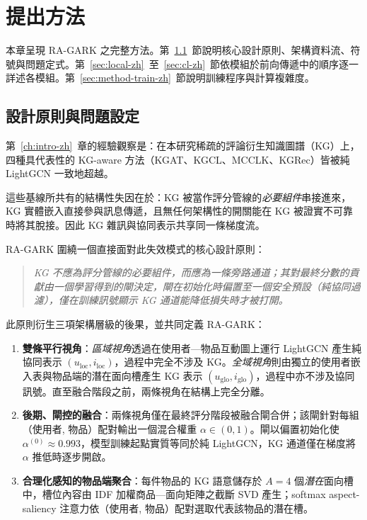 \chapter{提出方法}
\label{ch:methodology-zh}
\label{ch:architecture-zh}

本章呈現 RA-GARK 之完整方法。第~\ref{sec:approach-principle-zh}~節說明核心設計原則、架構資料流、符號與問題定式。第~\ref{sec:local-zh}~至~\ref{sec:cl-zh}~節依模組於前向傳遞中的順序逐一詳述各模組。第~\ref{sec:method-train-zh}~節說明訓練程序與計算複雜度。

\section{設計原則與問題設定}
\label{sec:approach-principle-zh}

第~\ref{ch:intro-zh}~章的經驗觀察是：在本研究稀疏的評論衍生知識圖譜（KG）上，四種具代表性的 KG-aware 方法（KGAT、KGCL、MCCLK、KGRec）皆被純 LightGCN 一致地超越。

這些基線所共有的結構性失因在於：KG 被當作評分管線的\emph{必要組件}串接進來，KG 實體嵌入直接參與訊息傳遞，且無任何架構性的開關能在 KG 被證實不可靠時將其脫接。因此 KG 雜訊與協同表示共享同一條梯度流。

RA-GARK 圍繞一個直接面對此失效模式的核心設計原則：

\begin{quote}
\emph{KG 不應為評分管線的必要組件，而應為一條旁路通道；其對最終分數的貢獻由一個學習得到的閘決定，閘在初始化時偏置至一個安全預設（純協同過濾），僅在訓練訊號顯示 KG 通道能降低損失時才被打開。}
\end{quote}

此原則衍生三項架構層級的後果，並共同定義 RA-GARK：

\begin{enumerate}
  \item \textbf{雙條平行視角}：\emph{區域視角}透過在使用者—物品互動圖上運行 LightGCN 產生純協同表示 $(u_{\mathrm{loc}}, i_{\mathrm{loc}})$，過程中完全不涉及 KG。\emph{全域視角}則由獨立的使用者嵌入表與物品端的潛在面向槽產生 KG 表示 $(u_{\mathrm{glo}}, i_{\mathrm{glo}})$，過程中亦不涉及協同訊號。直至融合階段之前，兩條視角在結構上完全分離。
  \item \textbf{後期、閘控的融合}：兩條視角僅在最終評分階段被融合閘合併；該閘針對每組（使用者, 物品）配對輸出一個混合權重 $\alpha \in (0, 1)$。閘以偏置初始化使 $\alpha^{(0)} \approx 0.993$，模型訓練起點實質等同於純 LightGCN，KG 通道僅在梯度將 $\alpha$ 推低時逐步開啟。
  \item \textbf{合理化感知的物品端聚合}：每件物品的 KG 語意儲存於 $A=4$ 個\emph{潛在}面向槽中，槽位內容由 IDF 加權商品—面向矩陣之截斷 SVD 產生；softmax aspect-saliency 注意力依（使用者, 物品）配對選取代表該物品的潛在槽。
\end{enumerate}

